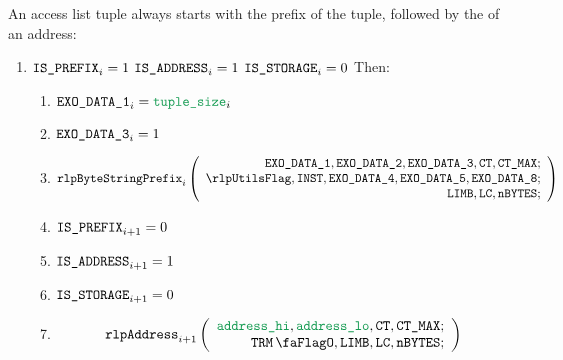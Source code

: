\begin{center}
\end{center}
An access list tuple always starts with the \rlp{} prefix of the tuple, followed by the \rlp{} of an address:
\begin{enumerate}[resume]
	\item \If $\texttt{IS\_PREFIX}_{i} = 1$ \et $\texttt{IS\_ADDRESS}_{i} = 1$ \et $\texttt{IS\_STORAGE}_{i} = 0$ Then:
		\begin{enumerate}
			\item $\exoDataColumn{1}_{i} = \locAccessListTupleSize_{i}$
			\item $\texttt{EXO\_DATA\_3}_{i} = 1$
			\item
				\[
					\rlpBytestringPrefix_{i}
					\left(
					\begin{array}{r}
						\exoDataColumn{1},
						\exoDataColumn{2},
						\exoDataColumn{3},
						\ct,
						\maxCt; \\
						\rlpUtilsFlag,
						\INST,
						\exoDataColumn{4},
						\exoDataColumn{5},
						\exoDataColumn{8}; \\
						\limb,
						\lc,
						\limbsize; \\
					\end{array}
					\right)
				\]
			\item $\texttt{IS\_PREFIX} _{i + 1} = 0$
			\item $\texttt{IS\_ADDRESS}   _{i + 1} = 1$
			\item $\texttt{IS\_STORAGE}    _{i + 1} = 0$
			\item
				\[
					\rlpAddress_{i+1}
					\left(
					\begin{array}{r}
						\locAddressHi,
						\locAddressLo,
						\ct,
						\maxCt; \\
						\trmFlag,
						\limb,
						\lc,
						\limbsize; \\
					\end{array}
					\right)
				\]
		\end{enumerate}


\end{enumerate}
